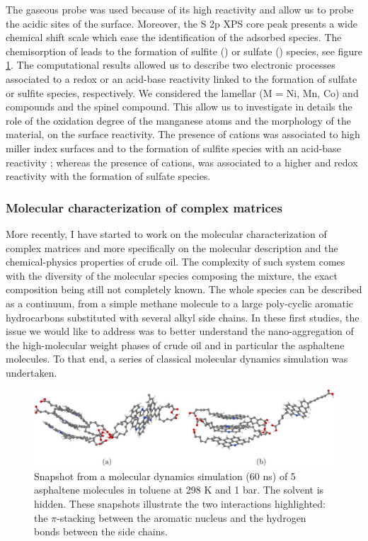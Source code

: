 \documentclass[11pt]{artuppax}
\newcounter{subsec}[section]
\begin{document}
The gaseous probe  was used because of its high reactivity and allow us to probe the acidic sites
of the surface. Moreover, the S 2p XPS core peak presents a wide chemical shift scale which ease the
identification of the adsorbed species.
The chemisorption of  leads to the formation of sulfite () or sulfate
() species, see figure \ref{fig:SO2}. The computational
results allowed us to describe two electronic processes associated to a redox or an acid-base reactivity
linked to the formation of sulfate or sulfite species, respectively. We considered the lamellar 
(M = Ni, Mn, Co) and  compounds and the spinel  compound. This allow us to investigate
in details the role of the oxidation degree of the manganese atoms and the morphology of the material, on
the surface reactivity. The presence of  cations was associated to high miller index surfaces
and to the formation of sulfite species with an acid-base reactivity ; whereas the presence of
 cations, was associated to a higher and redox reactivity with the formation of sulfate species.

\subsubsection{Molecular characterization of complex matrices}

More recently, I have started to work on the molecular characterization of complex matrices and more
specifically on the molecular description and the chemical-physics properties of
crude oil. The complexity of such system comes with the diversity of the molecular species composing the
mixture, the exact composition being still not completely known. The whole species can be
described as a continuum, from a simple methane molecule to a large poly-cyclic
aromatic hydrocarbons substituted with several alkyl side chains.
In these first studies, the issue we would like to address
was to better understand the nano-aggregation of the high-molecular weight phases of crude oil and
in particular the asphaltene molecules. To that end, a series of classical molecular dynamics
simulation was undertaken.

\begin{figure}[h]
    \centering
    \includegraphics[width=.8\textwidth]{img/asphaltene}
    \caption{Snapshot from a molecular dynamics simulation (60 ns) of 5 asphaltene molecules in
    toluene at 298 K and 1 bar. The solvent is hidden. These snapshots illustrate the two interactions
    highlighted: the $\pi$-stacking between the aromatic nucleus and the hydrogen bonds between
    the side chains.}
    \label{fig:SO2}
\end{figure}
\end{document}
